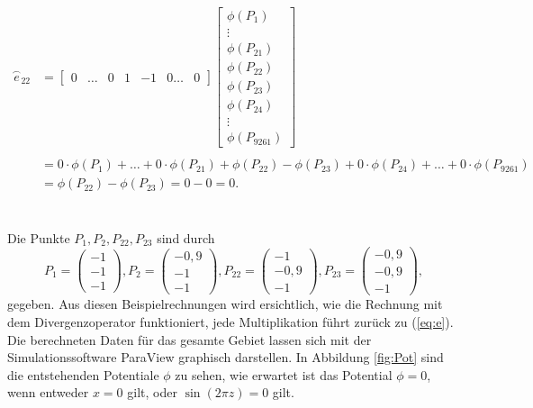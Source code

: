 \begin{equation} 
	\begin{split} 
		\overset{\frown}{e}_{22} &=  
		\begin{bmatrix} 
			0 & \dots & 0 & 1 & -1 & 0 \dots & 0 
		\end{bmatrix} 
		\begin{bmatrix} 
			\phi(P_1) \\ \vdots \\ \phi(P_{21}) \\ \phi(P_{22}) \\ \phi(P_{23}) \\ \phi(P_{24}) \\ 	\vdots 	\\ \phi(P_{9261}) 
		\end{bmatrix} 
		\\ \\ 
		&= 0\cdot\phi(P_1) + \dots + 0\cdot\phi(P_{21}) + \phi(P_{22}) - \phi(P_{23}) + 0\cdot\phi(P_{24}) + \dots + 0\cdot\phi(P_{9261}) \\ 
		&= \phi(P_{22}) - \phi(P_{23}) = 0 - 0 = 0. 
	\end{split} 
\end{equation}\\ \\ 
Die Punkte $P_1,P_2,P_{22},P_{23}$ sind durch 
\begin{equation*} 
	P_1 = \begin{pmatrix} 
	-1 \\ -1 \\ -1  
	\end{pmatrix},
	P_2 = \begin{pmatrix} 
	-0,9 \\ -1 \\ -1  
	\end{pmatrix},
	P_{22} = \begin{pmatrix} 
	-1 \\ -0,9 \\ -1
	\end{pmatrix}, 
	P_{23} = \begin{pmatrix} 
	-0,9 \\ -0,9 \\ -1  
	\end{pmatrix},
\end{equation*} gegeben. Aus diesen Beispielrechnungen wird ersichtlich, wie die Rechnung mit dem Divergenzoperator funktioniert, jede Multiplikation führt zurück zu (\ref{eq:e}). \\ 
Die berechneten Daten für das gesamte Gebiet lassen sich mit der Simulationssoftware ParaView graphisch darstellen. In Abbildung \ref{fig:Pot} sind die entstehenden Potentiale $\phi$ zu sehen, wie erwartet ist das Potential $\phi = 0$, wenn entweder $x = 0$ gilt, oder $\sin(2\pi z) = 0$ gilt. 

